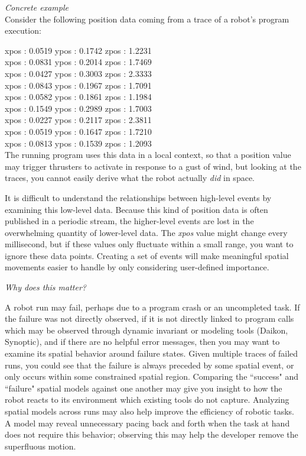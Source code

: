 \emph{Concrete example} \\
Consider the following position data coming from a trace of a robot's program execution:


xpos : 0.0519  ypos : 0.1742  zpos : 1.2231 \\
xpos : 0.0831  ypos : 0.2014  zpos : 1.7469 \\
xpos : 0.0427  ypos : 0.3003  zpos : 2.3333 \\
xpos : 0.0843  ypos : 0.1967  zpos : 1.7091 \\
xpos : 0.0582  ypos : 0.1861  zpos : 1.1984 \\
xpos : 0.1549  ypos : 0.2989  zpos : 1.7003 \\
xpos : 0.0227  ypos : 0.2117  zpos : 2.3811 \\
xpos : 0.0519  ypos : 0.1647  zpos : 1.7210 \\
xpos : 0.0813  ypos : 0.1539  zpos : 1.2093 \\

The running program uses this data in a local context, so that a position value may trigger thrusters to activate in response to a gust of wind, but looking at the traces, you cannot easily derive what the robot actually \emph{did} in space.

It is difficult to understand the relationships between high-level events by examining this low-level data.  
Because this kind of position data is often published in a periodic stream, the higher-level events are lost in the overwhelming quantity of lower-level data.
The \emph{xpos} value might change every millisecond, but if these values only fluctuate within a small range, you want to ignore these data points.  
Creating a set of events will make meaningful spatial movements easier to handle by only considering user-defined importance.  

\emph{Why does this matter?}  

A robot run may fail, perhaps due to a program crash or an uncompleted task.  
If the failure was not directly observed, if it is not directly linked to program calls which may be observed through dynamic invariant or modeling tools (Daikon, Synoptic), and if there are no helpful error messages, then you may want to examine its spatial behavior around failure states.
Given multiple traces of failed runs, you could see that the failure is always preceded by some spatial event, or only occurs within some constrained spatial region.
Comparing the ``success" and ``failure" spatial models against one another may give you insight to how the robot reacts to its environment which existing tools do not capture.
Analyzing spatial models across runs may also help improve the efficiency of robotic tasks.  
A model may reveal unnecessary pacing back and forth when the task at hand does not require this behavior; observing this may help the developer remove the superfluous motion.

